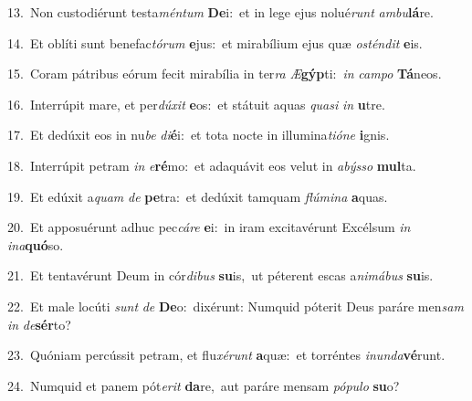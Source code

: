 {\numbfont\textcolor{\numbcolor}{13.}}~Non custodiérunt testa\-\textit{mén}\-\textit{tum} \textbf{De}\-i:~\star et in lege ejus nolué\textit{runt} \textit{am}\-\textit{bu}\textbf{lá}re.\par
{\numbfont\textcolor{\numbcolor}{14.}}~Et oblíti sunt benefac\-\textit{tó}\-\textit{rum} \textbf{e}\-jus:~\star et mirabílium ejus quæ \textit{os}\-\textit{tén}\textit{dit} \textbf{e}\-is.\par
{\numbfont\textcolor{\numbcolor}{15.}}~Coram pátribus eórum fecit mirabília in ter\textit{ra} \textit{Æ}\-\textbf{gýp}ti:~\star \textit{in} \textit{cam}\-\textit{po} \textbf{Tá}\-neos.\par
{\numbfont\textcolor{\numbcolor}{16.}}~Interrúpit mare, et per\-\textit{dú}\-\textit{xit} \textbf{e}\-os:~\star et státuit aquas \textit{qua}\-\textit{si} \textit{in} \textbf{u}\-tre.\par
{\numbfont\textcolor{\numbcolor}{17.}}~Et dedúxit eos in nu\textit{be} \textit{di}\-\textbf{é}i:~\star et tota nocte in illumina\-\textit{ti}\-\textit{ó}\textit{ne} \textbf{i}\-gnis.\par
{\numbfont\textcolor{\numbcolor}{18.}}~Interrúpit petram \textit{in} \textit{e}\-\textbf{ré}mo:~\star et adaquávit eos velut in \textit{a}\-\textit{býs}\textit{so} \textbf{mul}\-ta.\par
{\numbfont\textcolor{\numbcolor}{19.}}~Et edúxit a\textit{quam} \textit{de} \textbf{pe}\-tra:~\star et dedúxit tamquam \textit{flú}\-\textit{mi}\textit{na} \textbf{a}\-quas.\par
{\numbfont\textcolor{\numbcolor}{20.}}~Et apposuérunt adhuc pec\-\textit{cá}\-\textit{re} \textbf{e}\-i:~\star in iram excitavérunt Excélsum \textit{in} \textit{in}\-\textit{a}\textbf{quó}so.\par
{\numbfont\textcolor{\numbcolor}{21.}}~Et tentavérunt Deum in cór\-\textit{di}\-\textit{bus} \textbf{su}\-is,~\star ut péterent escas a\-\textit{ni}\-\textit{má}\textit{bus} \textbf{su}\-is.\par
{\numbfont\textcolor{\numbcolor}{22.}}~Et male locúti \textit{sunt} \textit{de} \textbf{De}\-o:~\star dixérunt: Numquid póterit Deus paráre men\textit{sam} \textit{in} \textit{de}\-\textbf{sér}to?\par
{\numbfont\textcolor{\numbcolor}{23.}}~Quóniam percússit petram, et flu\-\textit{xé}\-\textit{runt} \textbf{a}\-quæ:~\star et torréntes \textit{in}\-\textit{un}\textit{da}\textbf{vé}runt.\par
{\numbfont\textcolor{\numbcolor}{24.}}~Numquid et panem pót\-\textit{e}\-\textit{rit} \textbf{da}\-re,~\star aut paráre mensam \textit{pó}\-\textit{pu}\textit{lo} \textbf{su}\-o?\par
